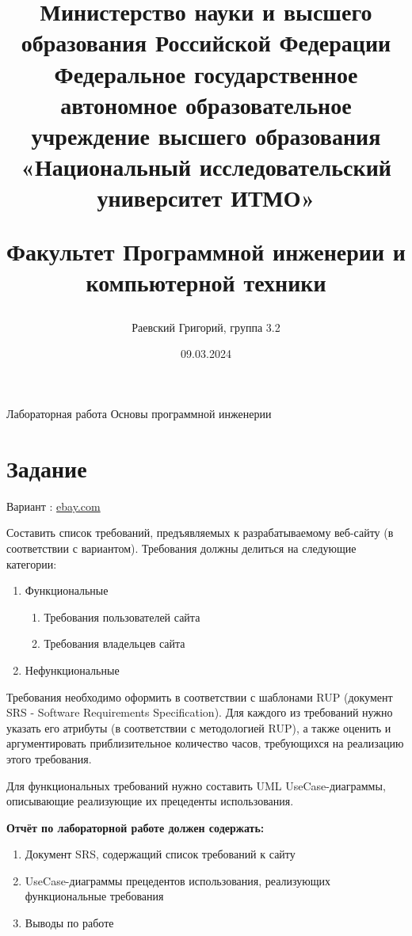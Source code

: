 \documentclass{article}
\title{Министерство науки и высшего образования Российской Федерации
Федеральное государственное автономное образовательное учреждение высшего образования 
«Национальный исследовательский университет ИТМО»

Факультет Программной инженерии и компьютерной техники
}
\date{09.03.2024}
\begin{document}
\renewcommand{\labelenumii}{\arabic{enumi}.\arabic{enumii}}
\renewcommand{\labelenumiii}{\arabic{enumi}.\arabic{enumii}.\arabic{enumiii}}
\renewcommand{\labelenumiv}{\arabic{enumi}.\arabic{enumii}.\arabic{enumiii}.\arabic{enumiv}}

\maketitle
\begin{center}
{\huge{Лабораторная работа  Основы программной инженерии }}
\\
{}

\author{Раевский Григорий, группа 3.2}
\end{center}

\setcounter{secnumdepth}{-1}



\tableofcontents
\newpage

\section{Задание}
Вариант : \href{https://www.ebay.com/}{ebay.com}

Составить список требований, предъявляемых к разрабатываемому веб-сайту (в соответствии с вариантом). Требования должны делиться на следующие категории:
\begin{enumerate}
    \item Функциональные
    \begin{enumerate}
        \item Требования пользователей сайта
        \item Требования владельцев сайта
    \end{enumerate}
    \item Нефункциональные
\end{enumerate}

Требования необходимо оформить в соответствии с шаблонами RUP (документ SRS - Software Requirements Specification). Для каждого из требований нужно указать его атрибуты (в соответствии с методологией RUP), а также оценить и аргументировать приблизительное количество часов, требующихся на реализацию этого требования.

Для функциональных требований нужно составить UML UseCase-диаграммы, описывающие реализующие их прецеденты использования.

\textbf{Отчёт по лабораторной работе должен содержать:}
\begin{enumerate}
    \item Документ SRS, содержащий список требований к сайту
    \item UseCase-диаграммы прецедентов использования, реализующих функциональные требования
    \item Выводы по работе
\end{enumerate}
\end{document}
